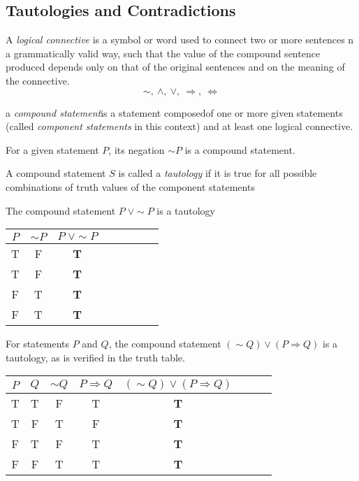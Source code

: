 \subsection{Tautologies and Contradictions}
\begin{defi}
     A \emph{logical connective} is a symbol or word used to connect two or more sentences
     n a grammatically valid way, such that the value of the compound sentence produced 
     depends only on that of the original sentences and on the meaning of the connective.
     \begin{equation*}
          \sim,\:\wedge,\:\vee,\:\Rightarrow,\:\Leftrightarrow 
     \end{equation*}
\end{defi}
\begin{defi}
    a \emph{compound statement}is a statement composedof one or more 
    given statements (called \emph{component statements} in this context) and
    at least one logical connective.
\end{defi}
\begin{eg}
     For a given statement $P$, its negation $\sim P$ is a compound statement.
\end{eg}
\begin{defi}[Tautology]
    A compound statement $S$ is called a \emph{tautology} if it is true for 
    all possible combinations of truth values of the component statements
\end{defi}
\begin{eg}
     The compound statement $P\;\vee \sim P$ is a tautology
     \begin{center}
        \begin{tabular}{cccccccc}
          \toprule
          $P$ & $\sim P$ &$P\;\vee \sim P$ \\
          \midrule
          T & F & \textbf{T} \\
          T & F & \textbf{T} \\
          F & T & \textbf{T} \\
          F & T & \textbf{T} \\
          \bottomrule
        \end{tabular}
      \end{center}
\end{eg}
\begin{eg}
    For statements $P$ and $Q$, the compound statement $(\sim Q) \vee (P \Rightarrow Q)$ 
    is a tautology, as is verified in the truth table.
    \begin{center}
        \begin{tabular}{cccccccc}
          \toprule
          $P$ & $Q$ &$\sim Q$ & $P \Rightarrow Q$& $(\sim Q) \vee (P \Rightarrow Q)$ \\
          \midrule
          T & T & F & T & \textbf{T} \\
          T & F & T & F & \textbf{T} \\
          F & T & F & T & \textbf{T} \\
          F & F & T & T & \textbf{T} \\
          \bottomrule
        \end{tabular}
      \end{center}
\end{eg}
